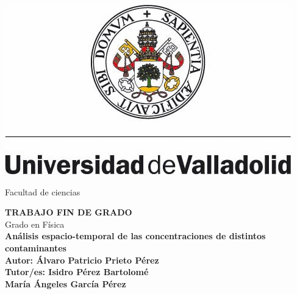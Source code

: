 \documentclass[12pt]{article}
\begin{document}
\begin{titlepage}

\begin{center}

\begin{minipage}[c]{170mm}
\includegraphics[scale=0.7]{logo_uva}

\hspace{1.2cm}Facultad de ciencias
\end{minipage}

\end{center}
\begin{center}

\vspace{4cm}
\Huge \textbf{TRABAJO FIN DE GRADO} \\
\vspace{2cm}
\Large Grado en Física \\
\vspace{2cm}
{\Large \textbf{Análisis espacio-temporal de las concentraciones de distintos contaminantes}} \\
\vspace{4cm}
\normalsize \textbf{Autor: Álvaro Patricio Prieto Pérez} \\
\vspace{1cm}
\textbf{Tutor/es: Isidro Pérez Bartolomé \\ María Ángeles García Pérez}

\end{center}

\end{titlepage}

\newpage
\begin{minipage}[]{20cm}
\vspace{10cm}
\end{minipage}
\newpage
\end{document}
